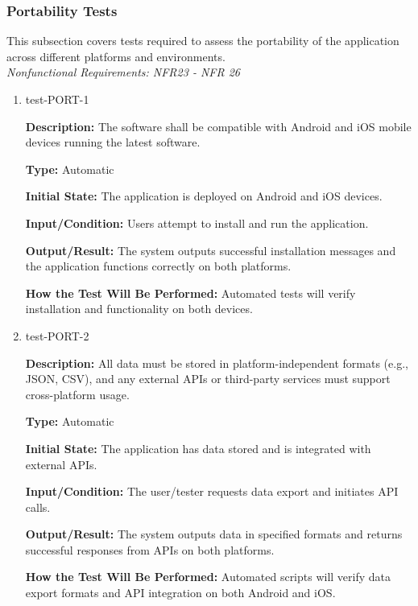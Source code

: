 \documentclass[12pt, titlepage]{article}
\begin{document}
\subsubsection{Portability Tests}

This subsection covers tests required to assess the portability of the application across different platforms and environments. \\
\textit{Nonfunctional Requirements: NFR23 - NFR 26}

\begin{enumerate}

\item{test-PORT-1\\}

\textbf{Description:} The software shall be compatible with Android and iOS
mobile devices running the latest software.

\textbf{Type:} Automatic
					
\textbf{Initial State:} The application is deployed on Android and iOS devices.
					
\textbf{Input/Condition:} Users attempt to install and run the application.
					
\textbf{Output/Result:} The system outputs successful installation messages and
the application functions correctly on both platforms.
					
\textbf{How the Test Will Be Performed:} Automated tests will verify
installation and functionality on both devices.

\item{test-PORT-2\\}

\textbf{Description:} All data must be stored in platform-independent formats
(e.g., JSON, CSV), and any external APIs or third-party services must support
cross-platform usage.

\textbf{Type:} Automatic
					
\textbf{Initial State:} The application has data stored and is integrated with
external APIs.
					
\textbf{Input/Condition:} The user/tester requests data export and initiates API
calls.
					
\textbf{Output/Result:} The system outputs data in specified formats and returns
successful responses from APIs on both platforms.
					
\textbf{How the Test Will Be Performed:} Automated scripts will verify data
export formats and API integration on both Android and iOS.


\end{enumerate}
\end{document}
